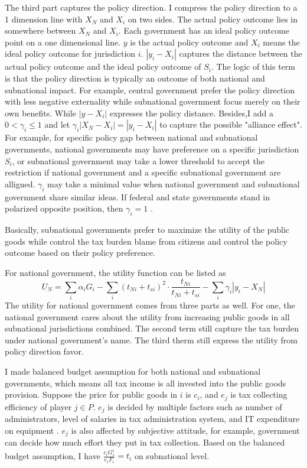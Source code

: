 \begin{itemize}
The third part captures the policy direction. I compress the policy direction to a 1 dimension line with $X_N$ and $X_i$ on two sides. The actual policy outcome lies in somewhere between $X_N$ and $X_i$. Each government has an ideal policy outcome point on a one dimensional line. $y$ is the actual policy outcome and $X_i$ means the ideal policy outcome for jurisdiction $i$. $|y_i-X_i|$ captures the distance between the actual policy outcome and the ideal policy outcome of $S_i$. The logic of this term is that the policy direction is typically an outcome of both national and subnational impact. For example, central government prefer the policy direction with less negative externality while subnational government focus merely on their own benefits.\label{iposition} While $|y-X_i|$ expresses the policy distance. Besides,I add a $0<\gamma_i\leq 1$ and let $\gamma_i|X_N-X_i|=|y_i-X_i|$ to capture the possible "alliance effect". For example, for specific policy gap between national and subnational governments, national governments may have preference on a specific jurisdiction $S_i$, or subnational government may take a lower threshold to accept the restriction if national government and a specific subnational government are alligned. $\gamma_i$ may take a minimal value when national government and subnational government share similar ideas. If federal and state governments stand in polarized opposite position, then $\gamma_i=1$ \label{actposition}.

Basically, subnational governments prefer to maximize the utility of the public goods while control the tax burden blame from citizens and control the policy outcome based on their policy preference.

For national government, the utility function can be listed as
$$U_N = \sum_i \alpha_i G_i - \sum_i (t_{Ni}+t_{si})^2\cdot \frac{t_{Ni}}{t_{Ni}+t_{si}} - \sum_i \gamma_i |y_i-X_N|$$
The utility for national government comes from three parts as well. For one, the national government cares about the utility from increasing public goods in all subnational jurisdictions combined. The second term still capture the tax burden under national government's name. The  third therm still express the utility from policy direction favor.

I made balanced budget assumption for both national and subnational governments, which means all tax income is all invested into the public goods provision. Suppose the price for public goods in $i$ is $c_i$, and $e_j$ is tax collecting efficiency of player $j \in P$. $e_j$ is decided by multiple factors such as number of administrators, level of salaries in tax administration system, and IT expenditure on equipment \cite{savic2015impact,kiser1994could,aizenman2008collection,mattos2011flypaper}. $e_j$ is also affected by subjective attitude, for example, government can decide how much effort they put in tax collection. Based on the balanced budget assumption, I have $\frac{c_i G_s^i}{e_i F_i}=t_i$ on subnational level.\label{priceandeffort}


\end{itemize}
